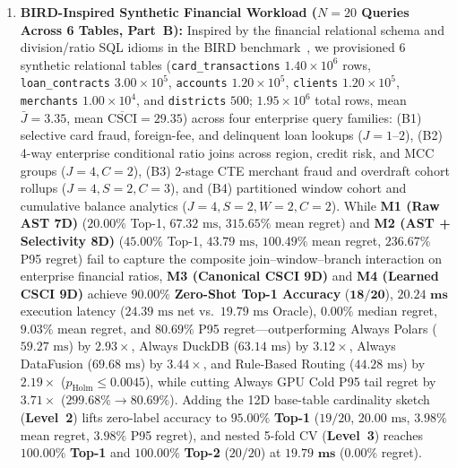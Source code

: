 \documentclass[10pt,a4paper]{article}
\begin{document}
\begin{enumerate}[leftmargin=1.5em,itemsep=0.8pt]
with the static 12D base-table join-fanout sketch (\textbf{Level~2}) reaches $\mathbf{96.67\%}$ \textbf{Top-1} ($\mathbf{29/30}$) and $\mathbf{100.00\%}$ \textbf{Top-2} at $\mathbf{20.03\text{ ms}}$ ($0.53\%$ mean regret, $0.00\%$ P95 regret, $\text{ECE}=6.73\%$), while nested 5-fold CV (\textbf{Level~3}) reaches $\mathbf{100.00\%}$ \textbf{Top-1} ($30/30$, $19.88\text{ ms}$).
    \item \textbf{BIRD-Inspired Synthetic Financial Workload ($N=20$ Queries Across 6 Tables, Part~B):} Inspired by the financial relational schema and division/ratio SQL idioms in the BIRD benchmark~\cite{li2023bird}, we provisioned 6 synthetic relational tables (\texttt{card\_transactions} $1.40\times 10^6$ rows, \texttt{loan\_contracts} $3.00\times 10^5$, \texttt{accounts} $1.20\times 10^5$, \texttt{clients} $1.20\times 10^5$, \texttt{merchants} $1.00\times 10^4$, and \texttt{districts} $500$; $1.95\times 10^6$ total rows, mean $\bar{J}=3.35$, mean $\overline{\text{CSCI}}=29.35$) across four enterprise query families: (B1) selective card fraud, foreign-fee, and delinquent loan lookups ($J=1\text{--}2$), (B2) 4-way enterprise conditional ratio joins across region, credit risk, and MCC groups ($J=4, C=2$), (B3) 2-stage CTE merchant fraud and overdraft cohort rollups ($J=4, S=2, C=3$), and (B4) partitioned window cohort and cumulative balance analytics ($J=4, S=2, W=2, C=2$). While \textbf{M1 (Raw AST 7D)} ($20.00\%$ Top-1, $67.32\text{ ms}$, $315.65\%$ mean regret) and \textbf{M2 (AST + Selectivity 8D)} ($45.00\%$ Top-1, $43.79\text{ ms}$, $100.49\%$ mean regret, $236.67\%$ P95 regret) fail to capture the composite join--window--branch interaction on enterprise financial ratios, \textbf{M3 (Canonical CSCI 9D)} and \textbf{M4 (Learned CSCI 9D)} achieve $\mathbf{90.00\%}$ \textbf{Zero-Shot Top-1 Accuracy} ($\mathbf{18/20}$), $\mathbf{20.24\text{ ms}}$ execution latency ($24.39\text{ ms}$ net vs.\ $19.79\text{ ms}$ Oracle), $\mathbf{0.00\%}$ median regret, $\mathbf{9.03\%}$ mean regret, and $\mathbf{80.69\%}$ P95 regret---outperforming Always Polars ($59.27\text{ ms}$) by $\mathbf{2.93\times}$, Always DuckDB ($63.14\text{ ms}$) by $\mathbf{3.12\times}$, Always DataFusion ($69.68\text{ ms}$) by $\mathbf{3.44\times}$, and Rule-Based Routing ($44.28\text{ ms}$) by $\mathbf{2.19\times}$ ($p_{\text{Holm}}\le 0.0045$), while cutting Always GPU Cold P95 tail regret by $\mathbf{3.71\times}$ ($299.68\%\rightarrow 80.69\%$). Adding the 12D base-table cardinality sketch (\textbf{Level~2}) lifts zero-label accuracy to $\mathbf{95.00\%}$ \textbf{Top-1} ($19/20$, $20.00\text{ ms}$, $3.98\%$ mean regret, $3.98\%$ P95 regret), and nested 5-fold CV (\textbf{Level~3}) reaches $\mathbf{100.00\%}$ \textbf{Top-1} and $\mathbf{100.00\%}$ \textbf{Top-2} ($20/20$) at $\mathbf{19.79\text{ ms}}$ ($0.00\%$ regret).

\end{enumerate}
\end{document}
